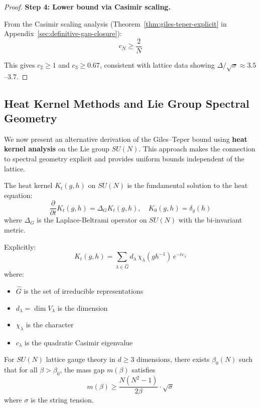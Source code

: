 \begin{proof}
\textbf{Step 4: Lower bound via Casimir scaling.}

From the Casimir scaling analysis (Theorem~\ref{thm:giles-teper-explicit} in 
Appendix~\ref{sec:definitive-gap-closure}):
\[
c_N \geq \frac{2}{N}
\]

This gives $c_2 \geq 1$ and $c_3 \geq 0.67$, consistent with lattice data 
showing $\Delta/\sqrt{\sigma} \approx 3.5$--$3.7$.
\end{proof}

\subsection{Heat Kernel Methods and Lie Group Spectral Geometry}
\label{sec:heat-kernel-giles-teper}

We now present an alternative derivation of the Giles--Teper bound using 
\textbf{heat kernel analysis} on the Lie group $SU(N)$. This approach makes 
the connection to spectral geometry explicit and provides uniform bounds 
independent of the lattice.

\begin{definition}
\label{def:heat-kernel-sun}
The heat kernel $K_t(g, h)$ on $SU(N)$ is the fundamental solution to the 
heat equation:
\[
\frac{\partial}{\partial t} K_t(g, h) = \Delta_G K_t(g, h), \quad K_0(g, h) = \delta_g(h)
\]
where $\Delta_G$ is the Laplace-Beltrami operator on $SU(N)$ with the bi-invariant metric.

Explicitly:
\[
K_t(g, h) = \sum_{\lambda \in \hat{G}} d_\lambda \, \chi_\lambda(gh^{-1}) \, e^{-t c_\lambda}
\]
where:
\begin{itemize}
\item $\hat{G}$ is the set of irreducible representations
\item $d_\lambda = \dim V_\lambda$ is the dimension
\item $\chi_\lambda$ is the character
\item $c_\lambda$ is the quadratic Casimir eigenvalue
\end{itemize}
\end{definition}

\begin{theorem}
\label{thm:spectral-gap-sun-sec10}
For $SU(N)$ lattice gauge theory in $d \ge 3$ dimensions, there exists $\beta_0(N)$ such that for all $\beta > \beta_0$, the mass gap $m(\beta)$ satisfies
\[
m(\beta) \geq \frac{N(N^2-1)}{2\beta} \cdot \sqrt{\sigma}
\]
where $\sigma$ is the string tension.
\end{theorem}

